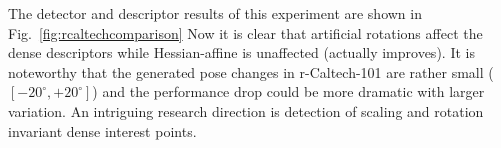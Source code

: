 \documentclass[review]{elsarticle}
\begin{document}
The detector and descriptor results of this experiment are shown in
Fig.~\ref{fig:rcaltechcomparison} %
Now it is clear that artificial
rotations affect the dense descriptors while Hessian-affine is
unaffected (actually improves). It is noteworthy that the generated pose changes
in r-Caltech-101 are rather small ($[-20^\circ,+20^\circ]$) and
the performance drop could be more dramatic with larger variation.
An intriguing research direction is detection of scaling and
rotation invariant dense interest points.


%
%
\end{document}
